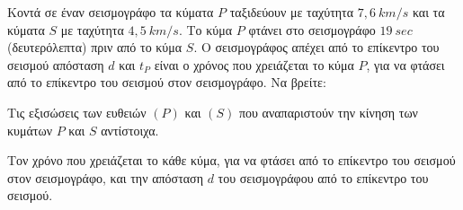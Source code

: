 \begin{alist}
\item Κοντά σε έναν σεισμογράφο τα κύματα $P$ ταξιδεύουν με ταχύτητα $7{,}6\ km/s$ και τα κύματα $S$ με ταχύτητα $4{,}5\ km/s$. Το κύμα $P$ φτάνει στο σεισμογράφο $19\ sec$ (δευτερόλεπτα) πριν από το κύμα $S$. Ο σεισμογράφος απέχει από το επίκεντρο του σεισμού απόσταση $d$ και $t_{P}$ είναι ο χρόνος που χρειάζεται το κύμα $P$, για να φτάσει από το επίκεντρο του σεισμού στον σεισμογράφο. Να βρείτε:

\begin{rlist}
\item Τις εξισώσεις των ευθειών $(P)$ και $(S)$ που αναπαριστούν την κίνηση των κυμάτων $P$ και $S$ αντίστοιχα.
\item Τον χρόνο που χρειάζεται το κάθε κύμα, για να φτάσει από το επίκεντρο του σεισμού στον σεισμογράφο, και την απόσταση $d$ του σεισμογράφου από το επίκεντρο του σεισμού.
\end{rlist}
\end{alist}

